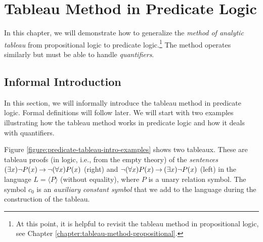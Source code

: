 \chapter{Tableau Method in Predicate Logic}

In this chapter, we will demonstrate how to generalize the \emph{method of analytic tableau} from propositional logic to predicate logic.\footnote{At this point, it is helpful to revisit the tableau method in propositional logic, see Chapter \ref{chapter:tableau-method-propositional}.} The method operates similarly but must be able to handle \emph{quantifiers}.

\section{Informal Introduction}

In this section, we will informally introduce the tableau method in predicate logic. Formal definitions will follow later. We will start with two examples illustrating how the tableau method works in predicate logic and how it deals with quantifiers.

\begin{example} Figure \ref{figure:predicate-tableau-intro-examples} shows two tableaux. These are tableau proofs (in logic, i.e., from the empty theory) of the \emph{sentences} $(\exists x)\neg P(x)\mathbin{\rightarrow}\neg(\forall x)P(x)$ (right) and $\neg(\forall x)P(x)\mathbin{\rightarrow}(\exists x)\neg P(x)$ (left) in the language $L=\langle P\rangle$ (without equality), where $P$ is a unary relation symbol. The symbol $c_0$ is an \emph{auxiliary constant symbol} that we add to the language during the construction of the tableau.
\end{example}


